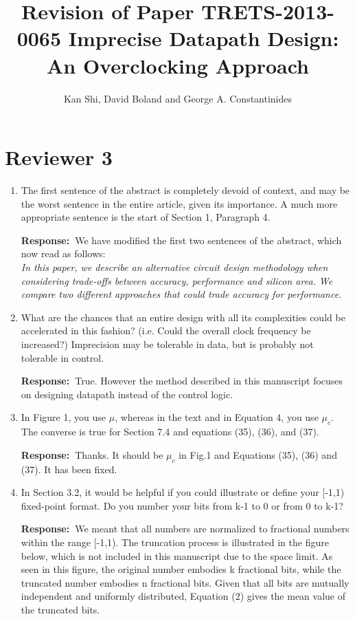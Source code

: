 \documentclass[a4paper, 11pt]{article}
\title{Revision of Paper TRETS-2013-0065 Imprecise Datapath Design: An Overclocking Approach}
\author{Kan Shi, David Boland and George A. Constantinides}
\date{}
\def\Response{\noindent \textbf{Response:~}}
\newcommand{\Question}[1]{\textcolor[rgb]{0.51,0.00,0.00}{#1}}
\newcommand{\PaperText}[1]{\emph{#1}}
\begin{document}
\maketitle

\section*{Reviewer 3}
\begin{enumerate}
  \item \Question{The first sentence of the abstract is completely devoid of context, and may be the worst sentence in the entire article, given its importance. A much more appropriate sentence is the start of Section 1, Paragraph 4.}
            
      \Response We have modified the first two sentences of the abstract, which now read as follows:\\
           
      \PaperText{In this paper, we describe an alternative circuit design methodology when considering trade-offs between accuracy, performance and silicon area. We compare two different approaches that could trade accuracy for performance.}\\

  \item \Question{What are the chances that an entire design with all its complexities could be accelerated in this fashion? (i.e. Could the overall clock frequency be increased?) Imprecision may be tolerable in data, but is probably not tolerable in control.}
            
      \Response True. However the method described in this manuscript focuses on designing datapath instead of the control logic.\\
      
  \item \Question{In Figure 1, you use $\mu$, whereas in the text and in Equation 4, you use $\mu_c$.  The converse is true for Section 7.4 and equations (35), (36), and (37).}
      
      \Response Thanks. It should be $\mu_c$ in Fig.1 and Equations (35), (36) and (37). It has been fixed.\\
      
  \item \Question{In Section 3.2, it would be helpful if you could illustrate or define your [-1,1) fixed-point format. Do you number your bits from k-1 to 0 or from 0 to k-1?}
      
      \Response We meant that all numbers are normalized to fractional numbers within the range [-1,1). The truncation process is illustrated in the figure below, which is not included in this manuscript due to the space limit. As seen in this figure, the original number embodies k fractional bits, while the truncated number embodies n fractional bits. Given that all bits are mutually independent and uniformly distributed, Equation (2) gives the mean value of the truncated bits. 
      

\end{enumerate}
\end{document}
